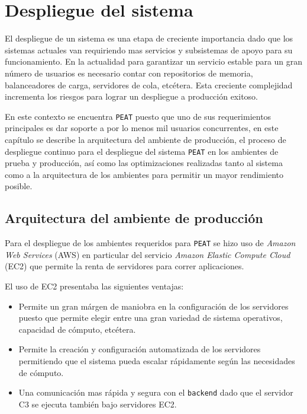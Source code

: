 \chapter{Despliegue del sistema}

El despliegue de un sistema es una etapa de creciente importancia dado que los
sistemas actuales van requiriendo mas servicios y subsistemas de apoyo para
su funcionamiento. En la actualidad para garantizar un servicio estable para
un gran número de usuarios es necesario contar con repositorios de memoria,
balanceadores de carga, servidores de cola, etcétera. Esta creciente complejidad
incrementa los riesgos para lograr un despliegue a producción exitoso.

En este contexto se encuentra \texttt{PEAT} puesto que uno de sus requerimientos
principales es dar soporte a por lo menos mil usuarios concurrentes, en este
capítulo se describe la arquitectura del ambiente de producción, el proceso
de despliegue continuo para el despliegue del sistema \texttt{PEAT} en los
ambientes de prueba y producción, así como las optimizaciones realizadas
tanto al sistema como a la arquitectura de los ambientes para permitir un mayor
rendimiento posible.

\section{Arquitectura del ambiente de producción}
\label{sec:production}

Para el despliegue de los ambientes requeridos para \texttt{PEAT} se hizo uso de
\textit{Amazon Web Services} (AWS) en particular del servicio
\textit{Amazon Elastic Compute Cloud} (EC2) que permite la renta de servidores
para correr aplicaciones.

El uso de EC2 presentaba las siguientes ventajas:
\begin{itemize}
\item Permite un gran márgen de maniobra en la configuración de los servidores
  puesto que permite elegir entre una gran variedad de sistema operativos,
  capacidad de cómputo, etcétera.
\item Permite la creación y configuración automatizada de los servidores
  permitiendo que el sistema pueda escalar rápidamente según las necesidades
  de cómputo.
\item Una comunicación mas rápida y segura con el \texttt{backend} dado que el
  servidor C3 se ejecuta también bajo servidores EC2.
\end{itemize}

